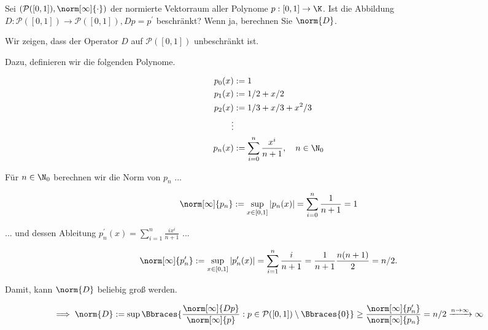 
\begin{exercise}

Sei $(\mathcal{P}([0, 1]), \norm[\infty]{\cdot})$ der normierte Vektorraum aller Polynome $p: [0, 1] \to \K$.
Ist die Abbildung $D: \mathcal{P}([0, 1]) \to \mathcal{P}([0, 1]), Dp = p^\prime$ beschränkt?
Wenn ja, berechnen Sie $\norm{D}$.

\end{exercise}


\begin{solution}

Wir zeigen, dass der Operator $D$ auf $\mathcal{P}([0, 1])$ unbeschränkt ist.

Dazu, definieren wir die folgenden Polynome.

\begin{align*}
    p_0(x) & := 1 \\
    p_1(x) & := 1/2 + x/2 \\
    p_2(x) & := 1/3 + x/3 + x^2 / 3 \\
    \vdots & \\
    p_n(x) & := \sum_{i=0}^n \frac{x^i}{n+1}, \quad n \in \N_0
\end{align*}

Für $n \in \N_0$ berechnen wir die Norm von $p_n$ ...

\begin{align*}
    \norm[\infty]{p_n}
    :=
    \sup_{x \in [0, 1]} |p_n(x)|
    =
    \sum_{i=0}^n \frac{1}{n+1} = 1
\end{align*}

... und dessen Ableitung $p_n^\prime(x) = \sum_{i=1}^n \frac{i x^i}{n+1}$ ...

\begin{align*}
    \norm[\infty]{p_n^\prime}
    :=
    \sup_{x \in [0, 1]} |p_n^\prime(x)|
    =
    \sum_{i=1}^n \frac{i}{n+1}
    =
    \frac{1}{n+1} \frac{n (n+1)}{2} = n/2.
\end{align*}

Damit, kann $\norm{D}$ beliebig groß werden.

\begin{align*}
    \implies
    \norm{D}
    :=
    \sup
    \Bbraces
    {
        \frac
        {
            \norm[\infty]{Dp}
        }{
            \norm[\infty]{p}
        }:
        p \in \mathcal{P}([0, 1]) \setminus \Bbraces{0}
    }
    \geq
    \frac{\norm[\infty]{p_n^\prime}}{\norm[\infty]{p_n}}
    =
    n/2 \xrightarrow{n \to \infty} \infty
\end{align*}

\end{solution}

